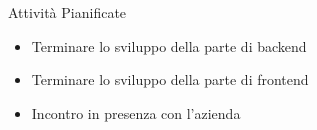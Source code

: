 \documentclass{beamer}
\begin{document}
\begin{frame}
    \begin{block}{Attività Pianificate}
        \begin{itemize}
            \item Terminare lo sviluppo della parte di backend
            \item Terminare lo sviluppo della parte di frontend
            \item Incontro in presenza con l'azienda
        \end{itemize}
    \end{block}
\end{frame}


\end{document}
